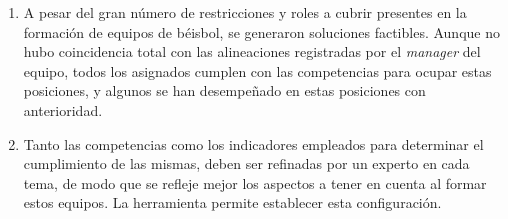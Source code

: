 \begin{enumerate}
	\item A pesar del gran número de restricciones y roles a cubrir presentes en la formación de equipos de béisbol, se generaron soluciones factibles. Aunque no hubo coincidencia total con las alineaciones registradas por el \textit{manager} del equipo, todos los asignados cumplen con las competencias para ocupar estas posiciones, y algunos se han desempeñado en estas posiciones con anterioridad.

	\item Tanto las competencias como los indicadores empleados para determinar el cumplimiento de las mismas, deben ser refinadas por un experto en cada tema, de modo que se refleje mejor los aspectos a tener en cuenta al formar estos equipos. La herramienta permite establecer esta configuración.
	
	
\end{enumerate}